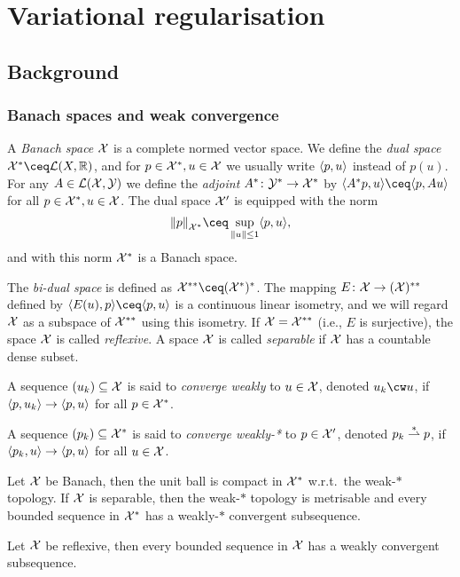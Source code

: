 \section{Variational regularisation}
\subsection{Background}
\subsubsection{Banach spaces and weak convergence}
A \emph{Banach space} $\mathcal X$ is a complete normed vector space. We define the \emph{dual space} $\XX^* \ceq \LL(X, \RR)$, and for $p \in \mathcal X^*, u \in \mathcal X$ we usually write $\langle p, u\rangle$ instead of $p(u)$.  For any $A \in \mathcal L(\mathcal X, \mathcal Y)$ we define the \emph{adjoint} $A^* \colon \mathcal Y^* \to \mathcal X^*$ by $\ang{A^*p, u} \ceq \ang{p, Au}$ for all $p \in \mathcal X^*, u \in \mathcal X$. The dual space $\mathcal X'$ is equipped with the norm
\[
\norm{p}_{\XX^*} \ceq \sup_{\norm{u}\leq 1} \ang{p, u}, 
\]
and with this norm $\mathcal X^*$ is a Banach space. 

The \emph{bi-dual space} is defined as $\XX^{**} \ceq (\XX^*)^*$. The mapping $E \colon \mathcal X \to (\mathcal X)^{**}$ defined by $\ang{E(u), p} \ceq \ang{p, u}$ is a continuous linear isometry, and we will regard $\mathcal X$ as a subspace of $\mathcal X^{**}$ using this isometry. If $\mathcal X = \mathcal X^{**}$ (i.e., $E$ is surjective), the space $\mathcal X$ is called \emph{reflexive}.
A space $\mathcal X$ is called \emph{separable} if $\mathcal X$ has a countable dense subset. 

A sequence $(u_k) \subseteq \mathcal X$ is said to \emph{converge weakly} to $u \in \mathcal X$, denoted $u_k \cw u$, if $\langle p, u_k\rangle \to \langle p, u\rangle$ for all $p \in \mathcal X^*$. 

A sequence $(p_k) \subseteq \mathcal X^*$ is said to \emph{converge weakly-*} to $p \in \mathcal X'$, denoted $p_k \overset{*}{\rightharpoonup} p$, if $\langle p_k, u\rangle \to \langle p, u\rangle$ for all $u \in \mathcal X$. 

\begin{theorem}
	Let $\mathcal X$ be Banach, then the unit ball is compact in $\mathcal X^*$ w.r.t.\ the weak-$*$ topology. If $\mathcal X$ is separable, then the weak-$*$ topology is metrisable and every bounded sequence in $\mathcal X^*$ has a weakly-$*$ convergent subsequence. 
\end{theorem}

\begin{theorem}
	Let $\mathcal X$ be reflexive, then every bounded sequence in $\mathcal X$ has a weakly convergent subsequence. 
\end{theorem}

